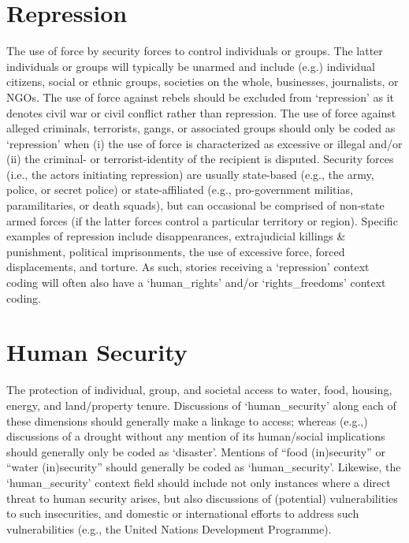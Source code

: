 \documentclass[11pt]{report}
\begin{document}
\section{Repression}\label{context:repression}

The use of force by security forces to control individuals or groups. The latter individuals or groups will typically be unarmed and include (e.g.) individual citizens, social or ethnic groups, societies on the whole, businesses, journalists, or NGOs. The use of force against rebels should be excluded from `repression' as it denotes civil war or civil conflict rather than repression. The use of force against alleged criminals, terrorists, gangs, or associated groups should only be coded as `repression' when (i) the use of force is characterized as excessive or illegal and/or (ii) the criminal- or terrorist-identity of the recipient is disputed. Security forces (i.e., the actors initiating repression) are usually state-based (e.g., the army, police, or secret police) or state-affiliated (e.g., pro-government militias, paramilitaries, or death squads), but can occasional be comprised of non-state armed forces (if the latter forces control a particular territory or region). Specific examples of repression include disappearances, extrajudicial killings \& punishment, political imprisonments, the use of excessive force, forced displacements, and torture. As such, stories receiving a `repression' context coding will often also have a `human\_rights' and/or `rights\_freedoms' context coding.

\section{Human Security}\label{context:human-sec}

The protection of individual, group, and societal access to water, food, housing, energy, and land/property tenure. Discussions of `human\_security' along each of these dimensions should generally make a linkage to access; whereas (e.g.,) discussions of a drought without any mention of its human/social implications should generally only be coded as `disaster'. Mentions of ``food (in)security'' or ``water (in)security'' should generally be coded as `human\_security'. Likewise, the `human\_security' context field should include not only instances where a direct threat to human security arises, but also discussions of (potential) vulnerabilities to such insecurities, and domestic or international efforts to address such vulnerabilities (e.g., the United Nations Development Programme).
\end{document}
